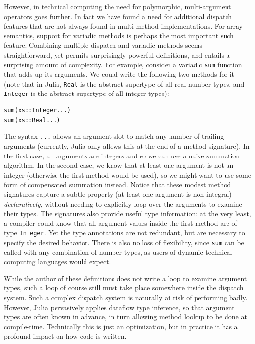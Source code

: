 \documentclass{sigplanconf}
\newcommand{\code}[1]{\texttt{#1}}
\begin{document}
However, in technical computing the need for polymorphic, multi-argument
operators goes further. In fact we have found a need for additional
dispatch features that are not always found in multi-method implementations.
For array semantics, support for variadic methods is perhaps the most
important such feature. Combining multiple dispatch and variadic methods
seems straightforward, yet permits surprisingly powerful definitions, and
entails a surprising amount of complexity. For example,
consider a variadic \code{sum} function that adds up its arguments. We could
write the following two methods for it (note that in Julia, \code{Real} is
the abstract supertype of all real number types, and \code{Integer} is the
abstract supertype of all integer types):

\begin{verbatim}
sum(xs::Integer...)
sum(xs::Real...)
\end{verbatim}

The syntax \code{...} allows an argument slot to match any number of trailing
arguments (currently, Julia only allows this at the end of a method signature).
In the first case, all arguments are integers and so we can use a naive
summation algorithm. In the second case, we know that at least one argument
is not an integer (otherwise the first method would be used), so we might want to use some form of compensated
summation instead. Notice that these modest method signatures
capture a subtle property (at least one argument is non-integral)
\emph{declaratively}, without needing to explicitly loop over the arguments
to examine their types. The signatures also provide useful type information:
at the very least, a compiler could know that all argument values inside
the first method are of type \code{Integer}. Yet the type annotations
are not redundant, but are necessary to specify the desired behavior. There
is also no loss of flexibility, since \code{sum} can be called with any combination
of number types, as users of dynamic technical computing languages would expect.

While the author of these definitions does not write a loop to examine
argument types, such a loop of course still must take place somewhere inside
the dispatch system. Such a complex dispatch system is naturally at risk of
performing badly. However, Julia pervasively applies dataflow type
inference, so that argument types are often known in advance, in turn
allowing method lookup to be done at compile-time. Technically this is
just an optimization, but in practice it has a profound impact on how code
is written.
\end{document}
